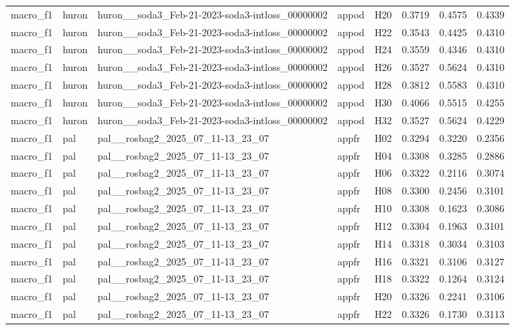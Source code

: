 \begin{table}[tbp]
\begin{tabular}{lllllrrr}
macro\_f1 & huron & huron\_\_soda3\_Feb-21-2023-soda3-intloss\_00000002 & appod & H20 & 0.3719 & 0.4575 & 0.4339 \\
macro\_f1 & huron & huron\_\_soda3\_Feb-21-2023-soda3-intloss\_00000002 & appod & H22 & 0.3543 & 0.4425 & 0.4310 \\
macro\_f1 & huron & huron\_\_soda3\_Feb-21-2023-soda3-intloss\_00000002 & appod & H24 & 0.3559 & 0.4346 & 0.4310 \\
macro\_f1 & huron & huron\_\_soda3\_Feb-21-2023-soda3-intloss\_00000002 & appod & H26 & 0.3527 & 0.5624 & 0.4310 \\
macro\_f1 & huron & huron\_\_soda3\_Feb-21-2023-soda3-intloss\_00000002 & appod & H28 & 0.3812 & 0.5583 & 0.4310 \\
macro\_f1 & huron & huron\_\_soda3\_Feb-21-2023-soda3-intloss\_00000002 & appod & H30 & 0.4066 & 0.5515 & 0.4255 \\
macro\_f1 & huron & huron\_\_soda3\_Feb-21-2023-soda3-intloss\_00000002 & appod & H32 & 0.3527 & 0.5624 & 0.4229 \\
macro\_f1 & pal & pal\_\_rosbag2\_2025\_07\_11-13\_23\_07 & appfr & H02 & 0.3294 & 0.3220 & 0.2356 \\
macro\_f1 & pal & pal\_\_rosbag2\_2025\_07\_11-13\_23\_07 & appfr & H04 & 0.3308 & 0.3285 & 0.2886 \\
macro\_f1 & pal & pal\_\_rosbag2\_2025\_07\_11-13\_23\_07 & appfr & H06 & 0.3322 & 0.2116 & 0.3074 \\
macro\_f1 & pal & pal\_\_rosbag2\_2025\_07\_11-13\_23\_07 & appfr & H08 & 0.3300 & 0.2456 & 0.3101 \\
macro\_f1 & pal & pal\_\_rosbag2\_2025\_07\_11-13\_23\_07 & appfr & H10 & 0.3308 & 0.1623 & 0.3086 \\
macro\_f1 & pal & pal\_\_rosbag2\_2025\_07\_11-13\_23\_07 & appfr & H12 & 0.3304 & 0.1963 & 0.3101 \\
macro\_f1 & pal & pal\_\_rosbag2\_2025\_07\_11-13\_23\_07 & appfr & H14 & 0.3318 & 0.3034 & 0.3103 \\
macro\_f1 & pal & pal\_\_rosbag2\_2025\_07\_11-13\_23\_07 & appfr & H16 & 0.3321 & 0.3106 & 0.3127 \\
macro\_f1 & pal & pal\_\_rosbag2\_2025\_07\_11-13\_23\_07 & appfr & H18 & 0.3322 & 0.1264 & 0.3124 \\
macro\_f1 & pal & pal\_\_rosbag2\_2025\_07\_11-13\_23\_07 & appfr & H20 & 0.3326 & 0.2241 & 0.3106 \\
macro\_f1 & pal & pal\_\_rosbag2\_2025\_07\_11-13\_23\_07 & appfr & H22 & 0.3326 & 0.1730 & 0.3113 \\

\end{tabular}
\end{table}
